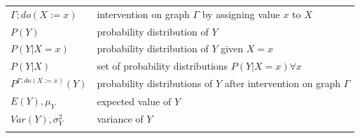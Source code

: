 \documentclass[
]{book}
\theoremstyle{definition}
\theoremstyle{definition}
\theoremstyle{definition}
\theoremstyle{remark}
\begin{document}
\begin{longtable}[]{@{}ll@{}}
\begin{minipage}[t]{0.47\columnwidth}
\(\Gamma;do(X:=x)\)\strut
\end{minipage} & \begin{minipage}[t]{0.47\columnwidth}\raggedright
intervention on graph \(\Gamma\) by assigning value \(x\) to \(X\)\strut
\end{minipage}\tabularnewline
\begin{minipage}[t]{0.47\columnwidth}\raggedright
\(P(Y)\)\strut
\end{minipage} & \begin{minipage}[t]{0.47\columnwidth}\raggedright
probability distribution of \(Y\)\strut
\end{minipage}\tabularnewline
\begin{minipage}[t]{0.47\columnwidth}\raggedright
\(P(Y|X = x)\)\strut
\end{minipage} & \begin{minipage}[t]{0.47\columnwidth}\raggedright
probability distribution of \(Y\) given \(X = x\)\strut
\end{minipage}\tabularnewline
\begin{minipage}[t]{0.47\columnwidth}\raggedright
\(P(Y|X)\)\strut
\end{minipage} & \begin{minipage}[t]{0.47\columnwidth}\raggedright
set of probability distributions \(P(Y|X = x) \forall x\)\strut
\end{minipage}\tabularnewline
\begin{minipage}[t]{0.47\columnwidth}\raggedright
\(P^{\Gamma;do(X:=x)}(Y)\)\strut
\end{minipage} & \begin{minipage}[t]{0.47\columnwidth}\raggedright
probability distributions of \(Y\) after intervention on graph \(\Gamma\)\strut
\end{minipage}\tabularnewline
\begin{minipage}[t]{0.47\columnwidth}\raggedright
\(E(Y), \mu_Y\)\strut
\end{minipage} & \begin{minipage}[t]{0.47\columnwidth}\raggedright
expected value of \(Y\)\strut
\end{minipage}\tabularnewline
\begin{minipage}[t]{0.47\columnwidth}\raggedright
\(Var(Y), \sigma_Y^2\)\strut
\end{minipage} & \begin{minipage}[t]{0.47\columnwidth}\raggedright
variance of \(Y\)\strut
\end{minipage}\tabularnewline
\begin{minipage}[t]{0.47\columnwidth}\raggedright

\end{minipage}
\end{longtable}
\end{document}
